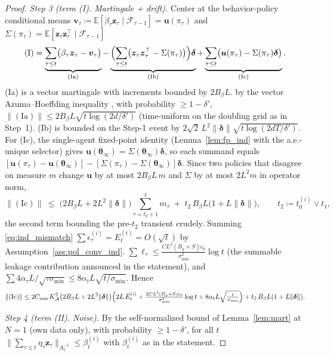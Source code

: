 \documentclass[11pt]{article}
\begin{document}
\begin{proof}
\emph{Step 3 (term (I). Martingale + drift).}  Center at the
behavior-policy conditional means
$\bm v_\tau\coloneqq\mathbb E[\beta_\tau\bm z_\tau\mid\mathcal F_{\tau-1}]
=\bm u(\pi_\tau)$ and
$\Sigma(\pi_\tau)=\mathbb E[\bm z_\tau\bm z_\tau^\top\mid\mathcal F_{\tau-1}]$ \[
(\mathrm I)=
\underbrace{\sum_{\tau\leq t}\bigl(\beta_\tau\bm z_\tau-\bm v_\tau\bigr)}_{(\mathrm{Ia})}
-\underbrace{\Bigl(\sum_{\tau\leq t}\bigl(\bm z_\tau\bm z_\tau^\top-\Sigma(\pi_\tau)\bigr)\Bigr)\bm\delta}_{(\mathrm{Ib})}
+\underbrace{\sum_{\tau\leq t}\bigl(\bm u(\pi_\tau)-\Sigma(\pi_\tau)\bm\delta\bigr)}_{(\mathrm{Ic})} .
\]
(Ia) is a vector martingale with increments bounded by $2B_\beta L$.
by the vector Azuma--Hoeffding inequality \citep{hayes2005}, with
probability $\geq 1-\delta'$,
$\|(\mathrm{Ia})\|\leq 2B_\beta L\sqrt{t\log(2d/\delta')}$
(time-uniform on the doubling grid as in Step~1).
(Ib) is bounded on the Step-1 event by
$2\sqrt2\,L^2\|\bm\delta\|\sqrt{t\log(2dT/\delta')}$.
For (Ic), the single-agent fixed-point identity
(Lemma~\ref{lem:fp_ind} with the a.e.-unique selector) gives
$\bm u(\bm\theta_\infty)=\Sigma(\bm\theta_\infty)\bm\delta$, so each
summand equals
$[\bm u(\pi_\tau)-\bm u(\bm\theta_\infty)]
-[\Sigma(\pi_\tau)-\Sigma(\bm\theta_\infty)]\bm\delta$.
Since two policies that disagree on measure $m$ change $\bm u$ by at
most $2B_\beta L\,m$ and $\Sigma$ by at most $2L^2 m$ in operator
norm,
\[
\|(\mathrm{Ic})\|
\;\leq\;\bigl(2B_\beta L+2L^2\|\bm\delta\|\bigr)
\sum_{\tau=t_2+1}^{t}m_\tau
\;+\;t_2\,B_\beta L\bigl(1+L\|\bm\delta\|\bigr),
\qquad t_2\coloneqq t_0^{(i)}\vee t_1,
\]
the second term bounding the pre-$t_2$ transient crudely.  Summing
\eqref{eq:ind_mismatch} $\sum\epsilon_\tau^{(i)}=E_t^{(i)}=O(\sqrt t)$
by Assumption~\ref{ass:pol_conv_ind}.
$\sum\ell_\tau\leq \tfrac{CL^3(B_y+S)c_0}{\sigma_{\min}^2}\log t$
(the summable leakage contribution announced in the statement), and $\sum 4\alpha_\tau L/\sqrt{\tau\sigma_{\min}}
\leq 8\alpha_t L\sqrt{t/\sigma_{\min}}$.  Hence
\[
\|(\mathrm{Ic})\|
\leq 2C_{\mathrm{mar}}K_{\mathcal A}^2
\bigl(2B_\beta L+2L^2\|\bm\delta\|\bigr)
\Bigl(2L\,E_t^{(i)}
+\tfrac{2CL^4(B_y+S)c_0}{\sigma_{\min}^2}\log t
+8\alpha_t L\sqrt{\tfrac{t}{\sigma_{\min}}}\Bigr)
+t_2\,B_\beta L(1+L\|\bm\delta\|).
\]

\emph{Step 4 (term (II). Noise).}  By the self-normalized bound of
Lemma~\ref{lem:mart} at $N=1$ (own data only), with probability
$\geq 1-\delta'$, for all $t$ $\bigl\|\sum_{\tau\leq t}\eta_\tau\bm z_\tau\bigr\|_{A_t^{-1}}
\leq\beta_t^{(i)}$ with $\beta_t^{(i)}$ as in the statement.


\end{proof}
\end{document}
